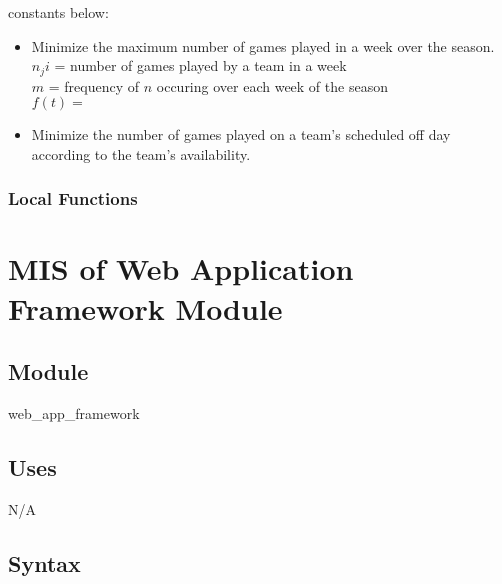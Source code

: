 \documentclass[12pt, titlepage]{article}
\begin{document}
\begin{itemize}
\begin{itemize}
  constants below:
  \begin{itemize}
    \item Minimize the maximum number of games played in a week over the
    season.
    $n_ji$ = number of games played by a team in a week\\
    $m$ = frequency of $n$ occuring over each week of the season\\
    $f(t) = $
    \item Minimize the number of games played on a team's scheduled off day
    according to the team's availability.
  \end{itemize}
\end{itemize}
\end{itemize}

\subsubsection{Local Functions}

 

\newpage

\section{MIS of Web Application Framework Module} \label{mWA}



\subsection{Module}

web\_app\_framework

\subsection{Uses}

N/A

\subsection{Syntax}
\end{document}
